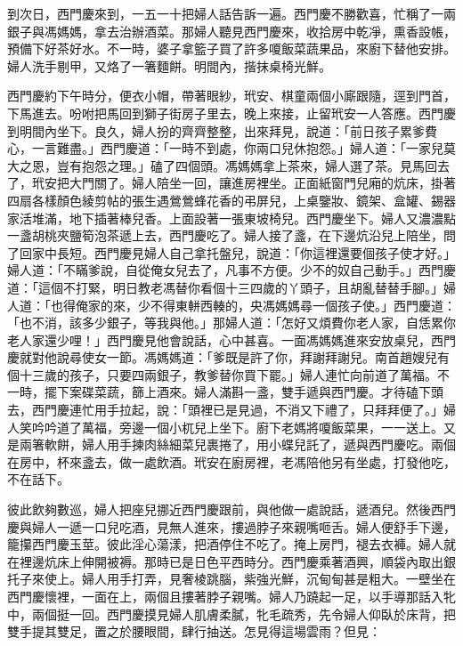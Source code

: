 到次日，西門慶來到，一五一十把婦人話告訴一遍。西門慶不勝歡喜，忙稱了一兩銀子與馮媽媽，拿去治辦酒菜。那婦人聽見西門慶來，收拾房中乾凈，熏香設帳，預備下好茶好水。不一時，婆子拿籃子買了許多嗄飯菜蔬果品，來廚下替他安排。婦人洗手剔甲，又烙了一箸麵餅。明間內，揩抹桌椅光鮮。

西門慶約下午時分，便衣小帽，帶著眼紗，玳安、棋童兩個小廝跟隨，逕到門首，下馬進去。吩咐把馬回到獅子街房子里去，晚上來接，止留玳安一人答應。西門慶到明間內坐下。良久，婦人扮的齊齊整整，出來拜見，說道：「前日孩子累爹費心，一言難盡。」西門慶道：「一時不到處，你兩口兒休抱怨。」婦人道：「一家兒莫大之恩，豈有抱怨之理。」磕了四個頭。馮媽媽拿上茶來，婦人選了茶。見馬回去了，玳安把大門關了。婦人陪坐一回，讓進房裡坐。正面紙窗門兒廂的炕床，掛著四扇各樣顏色綾剪帖的張生遇鶯鶯蜂花香的弔屏兒，上桌鑒妝、鏡架、盒罐、錫器家活堆滿，地下插著棒兒香。上面設著一張東坡椅兒。西門慶坐下。婦人又濃濃點一盞胡桃夾鹽筍泡茶遞上去，西門慶吃了。婦人接了盞，在下邊炕沿兒上陪坐，問了回家中長短。西門慶見婦人自己拿托盤兒，說道：「你這裡還要個孩子使才好。」婦人道：「不瞞爹說，自從俺女兒去了，凡事不方便。少不的奴自己動手。」西門慶道：「這個不打緊，明日教老馮替你看個十三四歲的丫頭子，且胡亂替替手腳。」婦人道：「也得俺家的來，少不得東軿西輳的，央馮媽媽尋一個孩子使。」西門慶道：「也不消，該多少銀子，等我與他。」那婦人道：「怎好又煩費你老人家，自恁累你老人家還少哩！」西門慶見他會說話，心中甚喜。一面馮媽媽進來安放桌兒，西門慶就對他說尋使女一節。馮媽媽道：「爹既是許了你，拜謝拜謝兒。南首趙嫂兒有個十三歲的孩子，只要四兩銀子，教爹替你買下罷。」婦人連忙向前道了萬福。不一時，擺下案碟菜蔬，篩上酒來。婦人滿斟一盞，雙手遞與西門慶。才待磕下頭去，西門慶連忙用手拉起，說：「頭裡已是見過，不消又下禮了，只拜拜便了。」婦人笑吟吟道了萬福，旁邊一個小杌兒上坐下。廚下老媽將嗄飯菜果，一一送上。又是兩箸軟餅，婦人用手揀肉絲細菜兒裹捲了，用小蝶兒託了，遞與西門慶吃。兩個在房中，杯來盞去，做一處飲酒。玳安在廚房裡，老馮陪他另有坐處，打發他吃，不在話下。

彼此飲夠數巡，婦人把座兒挪近西門慶跟前，與他做一處說話，遞酒兒。然後西門慶與婦人一遞一口兒吃酒，見無人進來，摟過脖子來親嘴咂舌。婦人便舒手下邊，籠攥西門慶玉莖。彼此淫心蕩漾，把酒停住不吃了。掩上房門，褪去衣褲。婦人就在裡邊炕床上伸開被褥。那時已是日色平西時分。西門慶乘著酒興，順袋內取出銀托子來使上。婦人用手打弄，見奢棱跳腦，紫強光鮮，沉甸甸甚是粗大。一壁坐在西門慶懷裡，一面在上，兩個且摟著脖子親嘴。婦人乃蹺起一足，以手導那話入牝中，兩個挺一回。西門慶摸見婦人肌膚柔膩，牝毛疏秀，先令婦人仰臥於床背，把雙手提其雙足，置之於腰眼間，肆行抽送。怎見得這場雲雨？但見：

